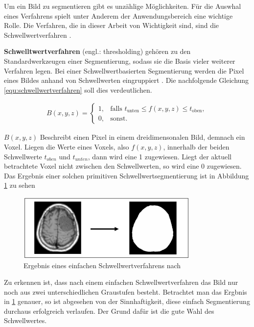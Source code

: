 Um ein Bild zu segmentieren gibt es unzählige Möglichkeiten. Für die Auswhal
eines Verfahrens spielt unter Anderem der Anwendungsbereich eine wichtige Rolle.
Die Verfahren, die in dieser Arbeit von Wichtigkeit sind, sind die Schwellwertverfahren
\citep[vgl.][Seite 361]{lehmann2013bildverarbeitung}.

\pagebreak

\textbf{Schwelltwertverfahren} (engl.: thresholding) gehören zu den Standardwerkzeugen
einer Segmentierung, sodass sie die Basis vieler weiterer Verfahren legen. Bei einer
Schwellwertbasierten Segmentierung werden die Pixel eines Bildes anhand von Schwellwerten
eingruppiert \citep[vgl.][Seite 96]{handels2000}. Die nachfolgende Gleichung
\ref{equ:schwellwertverfahren} soll dies verdeutlichen.

\begin{align}
	\label{equ:schwellwertverfahren}B(x, y, z) = \begin{cases}1,&\text{falls }t_{\text{unten}}\leq f(x, y, z) \leq t_{\text{oben}}, \\ 0,&\text{sonst}.\end{cases}
\end{align}

$B(x, y, z)$ Beschreibt einen Pixel in einem dreidimensonalen Bild, demnach ein
Voxel. Liegen die Werte eines Voxels, also $f(x, y, z)$, innerhalb der beiden Schwellwerte
$t_{oben}$ und $t_{unten}$, dann wird eine 1 zugewiesen. Liegt der aktuell betrachtete
Voxel nicht zwischen den Schwellwerten, so wird eine 0 zugewiesen. Das Ergebnis einer
solchen primitiven Schwellwertsegmentierung ist in Abbildung \ref{fig:binäres_schwellwertverfahren}
zu sehen

\begin{figure}[h]
	\centering
	\includegraphics[width=0.8\textwidth]{img/beispiel_schwellwertverfahren.jpg}
	\caption{Ergebnis eines einfachen Schwellwertverfahrens nach \citet[Seite 96]{handels2000}}
	\label{fig:binäres_schwellwertverfahren}
\end{figure}

Zu erkennen ist, dass nach einem einfachen Schwellwertverfahren das Bild nur
noch aus zwei unterschiedlichen Graustufen besteht. Betrachtet man das Ergbnis in
\ref{fig:binäres_schwellwertverfahren} genauer, so ist abgesehen von der
Sinnhaftigkeit, diese einfach Segmentierung durchaus erfolgreich verlaufen. Der
Grund dafür ist die gute Wahl des Schwellwertes.

